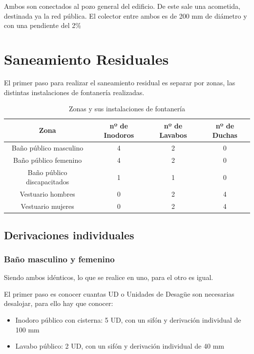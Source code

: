 \documentclass[../main.tex]{subfiles}
\begin{document}
Ambos son conectados al pozo general del edificio. De este sale una acometida, destinada ya la red pública. El colector entre ambos es de 200 mm de diámetro y con una pendiente del 2\%

\section{Saneamiento Residuales}

El primer paso para realizar el saneamiento residual es separar por zonas, las distintas instalaciones de fontanería realizadas.

\begin{table}[H]
    \centering
    \begin{tabular}{c|c|c|c}
    Zona & nº de Inodoros & nº de Lavabos & nº de Duchas \\ \hline
    Baño público masculino & 4 & 2 & 0 \\
    Baño público femenino & 4 & 2 & 0 \\
    Baño público discapacitados & 1 & 1 & 0 \\
    Vestuario hombres & 0 & 2 & 4 \\
    Vestuario mujeres & 0 & 2 & 4 \\
    \end{tabular}
    \caption{Zonas y sus instalaciones de fontanería}
\end{table}


\subsection{Derivaciones individuales}

\subsubsection{Baño masculino y femenino}

Siendo ambos idénticos, lo que se realice en uno, para el otro es igual. 

El primer paso es conocer cuantas UD o Unidades de Desagüe son necesarias desalojar, para ello hay que conocer:

\begin{itemize}
    \item Inodoro público con cisterna: 5 UD, con un sifón y derivación individual de 100 mm 
    \item Lavabo público: 2 UD, con un sifón y derivación individual de 40 mm
\end{itemize}
\end{document}
